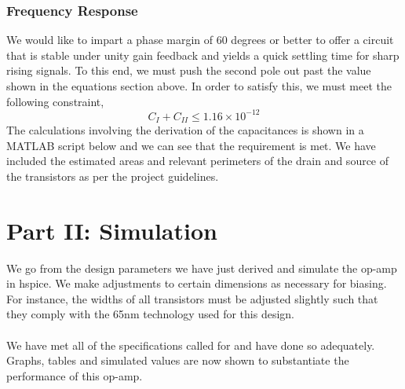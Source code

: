 \documentclass[]{article}
\begin{document}
			\subsubsection{Frequency Response}
				$$$$
				We would like to impart a phase margin of 60 degrees or better to offer a circuit that is stable under unity gain feedback and yields a quick settling time for sharp rising signals. To this end, we must push the second pole out past the value shown in the equations section above. In order to satisfy this, we must meet the following constraint,
				$$C_{I}+C_{II} \le 1.16\times 10^{-12}$$
				The calculations involving the derivation of the capacitances is shown in a\\ MATLAB script below and we can see that the requirement is met. We have included the estimated areas and relevant perimeters of the drain and source of the transistors as per the project guidelines.
		
				\pagebreak
				
					
		
	\section{Part II: Simulation}
		We go from the design parameters we have just derived and simulate the op-amp in hspice. We make adjustments to certain dimensions as necessary for biasing. For instance, the widths of all transistors must be adjusted slightly such that they comply with the 65nm technology used for this design.\\ \\
		We have met all of the specifications called for and have done so adequately. Graphs, tables and simulated values are now shown to substantiate the performance of this op-amp.
		
\end{document}
